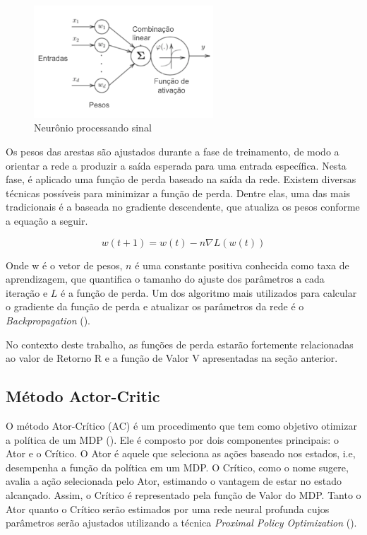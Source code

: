 \begin{figure}[H]
     \centering
     \includegraphics[width=0.6\textwidth]{figuras/ActivationFunc.png}
     \caption[Neurônio processando sinal]{Neurônio processando sinal \cite{Figueiredo}}
\end{figure}

Os pesos das arestas são ajustados durante a fase de treinamento,  de modo a orientar a rede a produzir a saída esperada para uma entrada específica. 
Nesta fase, é aplicado uma função de perda baseado na saída da rede. 
Existem diversas técnicas possíveis para minimizar a função de perda. 
Dentre elas, uma das mais tradicionais é a baseada no gradiente descendente, que atualiza os pesos conforme a equação a seguir. 

\begin{equation}
    w(t +1) = w(t) - n\nabla L(w(t)) 
\end{equation}

\noindent Onde w é o vetor de pesos, $n$ é uma constante positiva conhecida como taxa de aprendizagem, 
que quantifica o tamanho do ajuste dos parâmetros a cada iteração e $L$ é a função de perda. 
Um dos algoritmo mais utilizados para calcular o gradiente da função de perda e atualizar os parâmetros da rede é o \textit{Backpropagation} (\cite{Bishop}). 

No contexto deste trabalho, as funções de perda estarão fortemente relacionadas ao valor de Retorno R e a função de Valor V apresentadas na seção anterior. 


\subsection{Método Actor-Critic}

O método Ator-Crítico (AC) é um procedimento que tem como objetivo otimizar a política de um MDP (\cite{AC}). 
Ele é composto por dois componentes principais: o Ator e o Crítico. 
O Ator é aquele que seleciona as ações baseado nos estados, i.e, desempenha a função da política em um MDP. 
O Crítico, como o nome sugere, avalia a ação selecionada pelo Ator, estimando o vantagem de estar no estado alcançado. 
Assim, o Crítico é representado pela função de Valor do MDP. 
Tanto o Ator quanto o Crítico serão estimados por uma rede neural profunda cujos parâmetros serão ajustados utilizando a técnica \textit{Proximal Policy Optimization} (\cite{PPO}).



